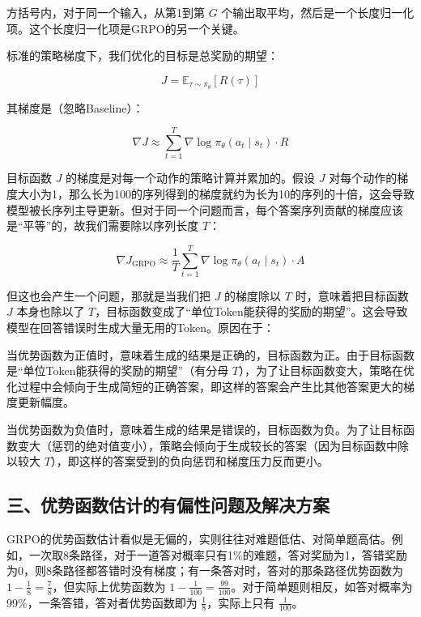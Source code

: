 方括号内，对于同一个输入，从第1到第 \(G\) 个输出取平均，然后是一个长度归一化项。这个长度归一化项是GRPO的另一个关键。

标准的策略梯度下，我们优化的目标是总奖励的期望：

\[
J=\mathbb{E}_{\tau\sim\pi_{\theta}}[R(\tau)]
\]

其梯度是（忽略Baseline）：

\[
\nabla J\approx \sum_{t=1}^{T}\nabla\log\pi_{\theta}(a_t\mid s_t)\cdot R
\]

目标函数 \(J\) 的梯度是对每一个动作的策略计算并累加的。假设 \(J\) 对每个动作的梯度大小为1，那么长为100的序列得到的梯度就约为长为10的序列的十倍，这会导致模型被长序列主导更新。但对于同一个问题而言，每个答案序列贡献的梯度应该是``平等''的，故我们需要除以序列长度 \(T\)：

\[
\nabla J_{\mathrm{GRPO}}\approx \frac{1}{T}\sum_{t=1}^{T}\nabla\log\pi_{\theta}(a_t\mid s_t)\cdot A
\]

但这也会产生一个问题，那就是当我们把 \(J\) 的梯度除以 \(T\) 时，意味着把目标函数 \(J\) 本身也除以了 \(T\)，目标函数变成了``单位Token能获得的奖励的期望''。这会导致模型在回答错误时生成大量无用的Token。原因在于：

当优势函数为正值时，意味着生成的结果是正确的，目标函数为正。由于目标函数是``单位Token能获得的奖励的期望''（有分母 \(T\)），为了让目标函数变大，策略在优化过程中会倾向于生成简短的正确答案，即这样的答案会产生比其他答案更大的梯度更新幅度。

当优势函数为负值时，意味着生成的结果是错误的，目标函数为负。为了让目标函数变大（惩罚的绝对值变小），策略会倾向于生成较长的答案（因为目标函数中除以较大 \(T\)），即这样的答案受到的负向惩罚和梯度压力反而更小。

\hypertarget{ux4e09ux4f18ux52bfux51fdux6570ux4f30ux8ba1ux7684ux6709ux504fux6027ux95eeux9898ux53caux89e3ux51b3ux65b9ux6848}{%
\subsection{三、优势函数估计的有偏性问题及解决方案}\label{ux4e09ux4f18ux52bfux51fdux6570ux4f30ux8ba1ux7684ux6709ux504fux6027ux95eeux9898ux53caux89e3ux51b3ux65b9ux6848}}

GRPO的优势函数估计看似是无偏的，实则往往对难题低估、对简单题高估。例如，一次取8条路径，对于一道答对概率只有1\%的难题，答对奖励为1，答错奖励为0，则8条路径都答错时没有梯度；有一条答对时，答对的那条路径优势函数为 \(1-\frac{1}{8}=\frac{7}{8}\)，但实际上优势函数为 \(1-\frac{1}{100}=\frac{99}{100}\)。对于简单题则相反，如答对概率为99\%，一条答错，答对者优势函数即为 \(\frac{1}{8}\)，实际上只有 \(\frac{1}{100}\)。

